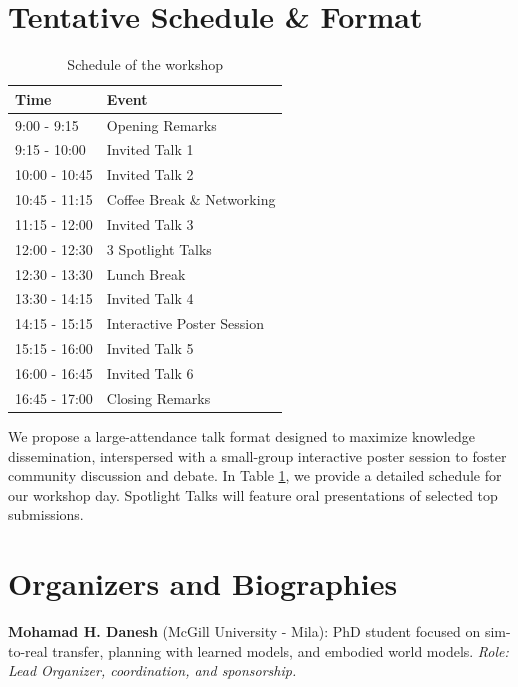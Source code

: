 \documentclass[10pt]{article} %
\begin{document}
\section{Tentative Schedule \& Format}

\begin{table}
\caption{Schedule of the workshop}
\label{tab:schedule}
\centering
\footnotesize
\begin{tabular}{ll}
\toprule
\textbf{Time} & \textbf{Event} \\
\midrule
9:00 - 9:15 & Opening Remarks \\
9:15 - 10:00 & Invited Talk 1 \\
10:00 - 10:45 & Invited Talk 2 \\
10:45 - 11:15 & Coffee Break \& Networking \\
11:15 - 12:00 & Invited Talk 3 \\
12:00 - 12:30 & 3 Spotlight Talks \\
12:30 - 13:30 & Lunch Break \\
13:30 - 14:15 & Invited Talk 4 \\
14:15 - 15:15 & Interactive Poster Session \\
15:15 - 16:00 & Invited Talk 5 \\
16:00 - 16:45 & Invited Talk 6 \\
16:45 - 17:00 & Closing Remarks \\
\bottomrule
\end{tabular}
\vspace{-2em}
\end{table}

We propose a large-attendance talk format designed to maximize knowledge dissemination, interspersed with a small-group interactive poster session to foster community discussion and debate. In Table \ref{tab:schedule}, we provide a detailed schedule for our workshop day. Spotlight Talks will feature oral presentations of selected top submissions.



\section{Organizers and Biographies}

\textbf{Mohamad H. Danesh} (McGill University - Mila): PhD student focused on sim-to-real transfer, planning with learned models, and embodied world models. \textit{Role: Lead Organizer, coordination, and sponsorship.}
\end{document}
